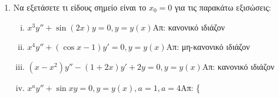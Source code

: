 


\pagestyle{empty}



\begin{center}
\end{center}

\vspace{\baselineskip}

\begin{enumerate}
\item Να εξετάσετε τι είδους σημείο είναι το $x_0=0$ για τις παρακάτω εξισώσεις:
\begin{enumerate}[i)]
\item $x^3y''+\sin(2x)y=0, y=y(x)$\hfill Απ: κανονικό ιδιάζον
\item $x^4y'' + (\cos x-1)y'=0, y=y(x)$\hfill Απ: μη-κανονικό ιδιάζον
\item $(x-x^2)y''-(1+2x)y'+2y=0, y=y(x)$\hfill Απ: κανονικό ιδιάζον
\item $x^{a}y''+\sin x y=0, y=y(x), a=1, a=4$\hfill Απ: \{
\end{enumerate}


\end{enumerate}
